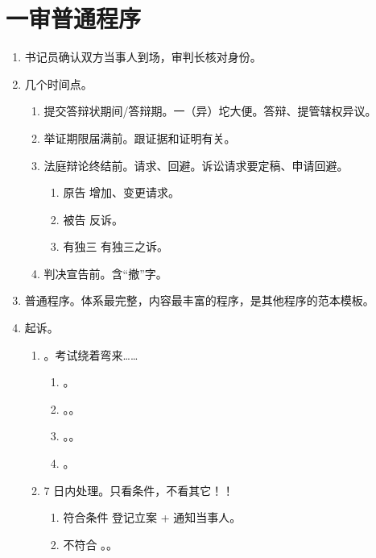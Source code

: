 \section{一审普通程序}
\begin{enumerate}
  \item 书记员确认双方当事人到场，审判长核对身份。
  \item 几个时间点。
        \begin{enumerate}
          \item 提交答辩状期间/答辩期。一（异）坨大便。答辩、提管辖权异议。
          \item 举证期限届满前。跟证据和证明有关。
          \item 法庭辩论终结前。请求、回避。诉讼请求要定稿、申请回避。
                \begin{enumerate}
                  \item 原告 \yjt 增加、变更请求。
                  \item 被告 \yjt 反诉。
                  \item 有独三 \yjt 有独三之诉。
                \end{enumerate}
          \item 判决宣告前。含“撤”字。
        \end{enumerate}
  \item 普通程序。体系最完整，内容最丰富的程序，是其他程序的范本模板。
  \item 起诉。
        \begin{enumerate}
          \item {}。考试绕着弯来……
                \begin{enumerate}
                  \item {}。
                  \item {}。。
                  \item {}。。
                  \item {}。
                \end{enumerate}
          \item 7 日内处理。只看条件，不看其它！！
                \begin{enumerate}
                  \item 符合条件 \yjt 登记立案 + 通知当事人。
                  \item 不符合 \yjt \yi {}。\er {}。

\end{enumerate}
\end{enumerate}
\end{enumerate}
